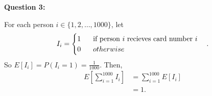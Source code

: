 \documentclass[12pt]{article}
\begin{document}
\noindent{}\textbf{Question 3:}

For each person $i \in \{1, 2, \ldots , 1000\}$, let
\begin{align*}
    I_i = \begin{cases}
              1 \hspace{4ex} \text{if person $i$ recieves card number $i$} \\
              0 \hspace{4ex} otherwise
          \end{cases}.
\end{align*}
So $E[I_i] = P(I_i = 1) = \frac{1}{1000}$. Then,
\begin{align*}
    E\left[ \sum_{i=1}^{1000}I_i \right] & = \sum_{i=1}^{1000}E[I_i] \\
                                         & = 1.
\end{align*}
\end{document}
